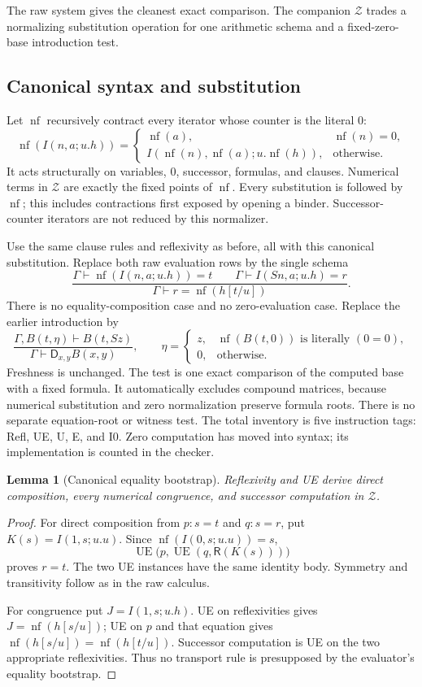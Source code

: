 \documentclass[11pt]{article}
\newtheorem{lemma}[theorem]{Lemma}
\theoremstyle{definition}
\newcommand{\Can}{\mathcal Z}
\newcommand{\nf}{\mathop{\mathrm{nf}}}
\newcommand{\D}{\mathsf D}
\newcommand{\Refl}{\mathsf R}
\begin{document}
The raw system gives the cleanest exact comparison. The companion $\Can$
trades a normalizing substitution operation for one arithmetic schema and
a fixed-zero-base introduction test.

\subsection{Canonical syntax and substitution}

Let $\nf$ recursively contract every iterator whose counter is the literal
$0$:
\[
 \nf(I(n,a;u.h))=
 \begin{cases}
   \nf(a),&\nf(n)=0,\\
   I(\nf(n),\nf(a);u.\nf(h)),&\text{otherwise}.
 \end{cases}
\]
It acts structurally on variables, $0$, successor, formulas, and clauses.
Numerical terms in $\Can$ are exactly the fixed points of $\nf$.
Every substitution is followed by $\nf$; this includes contractions first
exposed by opening a binder. Successor-counter iterators are not reduced
by this normalizer.

Use the same clause rules and reflexivity as before, all with this canonical
substitution. Replace both raw evaluation rows by the single schema
\[
 \frac{\Gamma\vdash\nf(I(n,a;u.h))=t\qquad
       \Gamma\vdash I(Sn,a;u.h)=r}
      {\Gamma\vdash r=\nf(h[t/u])}.
\tag{UE}\label{rule:ue}
\]
There is no equality-composition case and no zero-evaluation case.
Replace the earlier introduction by
\[
 \frac{\Gamma,B(t,\eta)\vdash B(t,Sz)}
      {\Gamma\vdash\D_{x,y}B(x,y)},\qquad
 \eta=\begin{cases}
 z,&\nf(B(t,0))\text{ is literally }(0=0),\\
 0,&\text{otherwise}.
 \end{cases}
\tag{I0}\label{rule:i-zero}
\]
Freshness is unchanged. The test is one exact comparison of the computed
base with a fixed formula. It automatically excludes compound matrices,
because numerical substitution and zero normalization preserve formula
roots. There is no separate equation-root or witness test. The total
inventory is five instruction tags: Refl, UE, U, E, and I0. Zero computation
has moved into syntax; its implementation is counted in the checker.

\begin{lemma}[Canonical equality bootstrap]
\label{lem:canonical-equality}
Reflexivity and UE derive direct composition, every numerical congruence,
and successor computation in $\Can$.
\end{lemma}
\begin{proof}
For direct composition from $p:s=t$ and $q:s=r$, put
$K(s)=I(1,s;u.u)$. Since $\nf(I(0,s;u.u))=s$,
\[
    \operatorname{UE}\bigl(p,\operatorname{UE}(q,\Refl(K(s)))\bigr)
\]
proves $r=t$. The two UE instances have the same identity body.
Symmetry and transitivity follow as in the raw calculus.

For congruence put $J=I(1,s;u.h)$. UE on reflexivities gives
$J=\nf(h[s/u])$; UE on $p$ and that equation gives
$\nf(h[s/u])=\nf(h[t/u])$. Successor computation is UE on the two
appropriate reflexivities. Thus no transport rule is presupposed by the
evaluator's equality bootstrap.
\end{proof}
\end{document}

